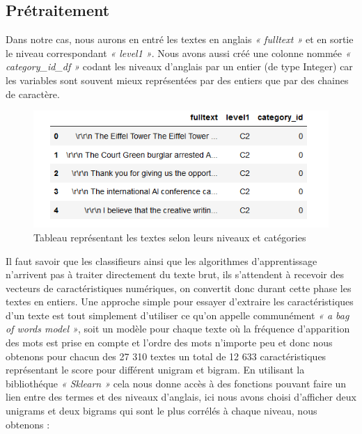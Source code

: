 \documentclass[11pt]{article}
\begin{document}
\subsection {Prétraitement}

Dans notre cas, nous aurons en entré les textes en anglais \textit{« fulltext »} et en sortie le niveau correspondant \textit{« level1 »}. \newline
Nous avons aussi créé une colonne nommée \textit{« category\_id\_df »} codant les niveaux d’anglais par un entier (de type Integer) car les variables sont souvent mieux représentées par des entiers que par des chaines de caractère.\newline \newline

\begin{figure}[!htb]
  \centering
    \caption{Tableau représentant les textes selon leurs niveaux et catégories}
    \includegraphics[width=\textwidth]{textmining.png}
\end{figure}

Il faut savoir que les classifieurs ainsi que les algorithmes d’apprentissage n’arrivent pas à traiter directement du texte brut, ils s’attendent à recevoir des vecteurs de caractéristiques numériques, on convertit donc durant cette phase les textes en entiers.\newline \newline
Une approche simple pour essayer d’extraire les caractéristiques d’un texte est tout simplement d’utiliser ce qu’on appelle communément \textit{« a bag of words model »}, soit un modèle pour chaque texte où la fréquence d’apparition des mots est prise en compte et l’ordre des mots n’importe peu et donc nous obtenons pour chacun des 27 310 textes un total de 12 633 caractéristiques représentant le score pour différent unigram  et bigram.\newline
En utilisant la bibliothéque \textit{« Sklearn »}  cela nous donne accès à des fonctions pouvant faire un lien entre des termes et des niveaux d’anglais, ici nous avons choisi d’afficher deux unigrams et deux bigrams qui sont le plus corrélés à chaque niveau, nous obtenons : 
\end{document}
